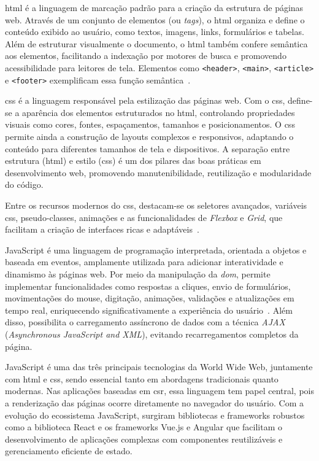 \acrfull{html} é a linguagem de marcação padrão para a criação da estrutura de páginas web. Através de um conjunto de elementos (ou \textit{tags}), o \acrshort{html} organiza e define o conteúdo exibido ao usuário, como textos, imagens, links, formulários e tabelas. Além de estruturar visualmente o documento, o \acrshort{html} também confere semântica aos elementos, facilitando a indexação por motores de busca e promovendo acessibilidade para leitores de tela. Elementos como \texttt{<header>}, \texttt{<main>}, \texttt{<article>} e \texttt{<footer>} exemplificam essa função semântica~\cite{alura_htmlcssjs}.

\acrfull{css} é a linguagem responsável pela estilização das páginas web. Com o \acrshort{css}, define-se a aparência dos elementos estruturados no \acrshort{html}, controlando propriedades visuais como cores, fontes, espaçamentos, tamanhos e posicionamentos. O \acrshort{css} permite ainda a construção de layouts complexos e responsivos, adaptando o conteúdo para diferentes tamanhos de tela e dispositivos. A separação entre estrutura (\acrshort{html}) e estilo (\acrshort{css}) é um dos pilares das boas práticas em desenvolvimento web, promovendo manutenibilidade, reutilização e modularidade do código.

Entre os recursos modernos do \acrshort{css}, destacam-se os seletores avançados, variáveis \acrshort{css}, pseudo-classes, animações e as funcionalidades de \textit{Flexbox} e \textit{Grid}, que facilitam a criação de interfaces ricas e adaptáveis~\cite{herocode_diferencas}.

JavaScript é uma linguagem de programação interpretada, orientada a objetos e baseada em eventos, amplamente utilizada para adicionar interatividade e dinamismo às páginas web. Por meio da manipulação da \textit{\acrfull{dom}}, permite implementar funcionalidades como respostas a cliques, envio de formulários, movimentações do mouse, digitação, animações, validações e atualizações em tempo real, enriquecendo significativamente a experiência do usuário~\cite{alura_htmlcssjs}. Além disso, possibilita o carregamento assíncrono de dados com a técnica \textit{AJAX} (\textit{Asynchronous JavaScript and XML}), evitando recarregamentos completos da página.

JavaScript é uma das três principais tecnologias da World Wide Web, juntamente com \acrshort{html} e \acrshort{css}, sendo essencial tanto em abordagens tradicionais quanto modernas. Nas aplicações baseadas em \acrshort{csr}, essa linguagem tem papel central, pois a renderização das páginas ocorre diretamente no navegador do usuário. Com a evolução do ecossistema JavaScript, surgiram bibliotecas e frameworks robustos como a biblioteca React e os frameworks Vue.js e Angular que facilitam o desenvolvimento de aplicações complexas com componentes reutilizáveis e gerenciamento eficiente de estado.

